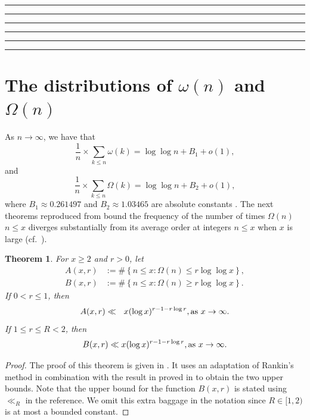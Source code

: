 \documentclass[11pt,reqno,a4letter]{article}
\numberwithin{equation}{section}
\numberwithin{figure}{section}
\numberwithin{table}{section}
\newcommand{\cf}{cf.~}
\theoremstyle{plain}
\newtheorem{theorem}{Theorem}
\numberwithin{theorem}{section}
\theoremstyle{definition}
\theoremstyle{remark}
\newcommand{\mathtext}[1]{\text{\rm #1}}
\begin{document}
\appendix
{}
\setcounter{section}{0} 
\renewcommand{\thesection}{\Alph{section}} 

\smallskip\hrule\hrule\hrule\hrule\hrule\hrule\smallskip

%

\section{The distributions of $\omega(n)$ and $\Omega(n)$} 
\label{subSection_TheKnownDistsOfThePrimeOmegaFunctions_IntroResults_v1} 

As $n \rightarrow \infty$, we have that 
$$\frac{1}{n} \times \sum_{k \leq n} \omega(k) = \log\log n + B_1 + o(1),$$ 
and 
$$\frac{1}{n} \times \sum_{k \leq n} \Omega(k) = \log\log n + B_2 + o(1),$$ 
where $B_1 \approx 0.261497$ and $B_2 \approx 1.03465$ are 
absolute constants \cite[\S 22.10]{HARDYWRIGHT}. 
The next theorems reproduced from \cite[\S 7.4]{MV} bound the frequency of the 
number of times $\Omega(n)$ $n \leq x$ 
diverges substantially from its average order at integers $n \leq x$ 
when $x$ is large 
(\cf \cite{ERDOS-KAC-REF,BILLINGSLY-CLT-PRIMEDIVFUNC}). 

\begin{theorem} 
\label{theorem_MV_Thm7.20-init_stmt} 
For $x \geq 2$ and $r > 0$, let 
\begin{align*} 
A(x, r) & := \#\left\{n \leq x: \Omega(n) \leq r \log\log x\right\}, \\ 
B(x, r) & := \#\left\{n \leq x: \Omega(n) \geq r \log\log x\right\}. 
\end{align*} 
If $0 < r \leq 1$, then 
\[
A(x, r) \ll\phantom{_R} x (\log x)^{r-1 - r\log r}, \mathtext{ as } x \rightarrow \infty. 
\]
If $1 \leq r \leq R < 2$, then 
\[
B(x, r) \ll x (\log x)^{r-1-r \log r}, \mathtext{ as } x \rightarrow \infty. 
\]
\end{theorem} 
\begin{proof}
The proof of this theorem is given in \cite[Thm.~7.20; \S 7.4]{MV}. 
It uses an adaptation of Rankin's method in combination with the result 
in proved in \cite[Thm.~7.18; \S 7.4]{MV} to obtain the two upper bounds. 
Note that the upper bound for the function $B(x, r)$ is stated using 
$\ll_R$ in the reference. 
We omit this extra baggage in the notation since $R \in [1, 2)$ is at most a bounded constant. 
\end{proof}
\end{document}

